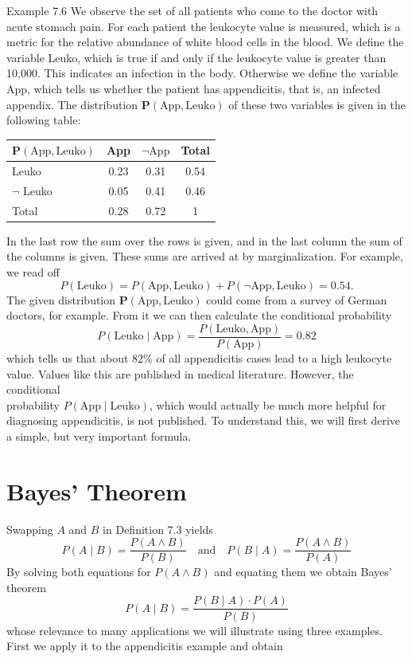 \documentclass[10pt]{book}
\begin{document}
Example 7.6 We observe the set of all patients who come to the doctor with acute stomach pain. For each patient the leukocyte value is measured, which is a metric for the relative abundance of white blood cells in the blood. We define the variable Leuko, which is true if and only if the leukocyte value is greater than 10,000. This indicates an infection in the body. Otherwise we define the variable App, which tells us whether the patient has appendicitis, that is, an infected appendix. The distribution $\boldsymbol{P}(\text{App}, \text{Leuko})$ of these two variables is given in the following table:

\begin{center}
\begin{tabular}{lccc}
\hline
$\boldsymbol{P}(\text{App}, \text{Leuko})$ & App & $\neg\text{App}$ & Total \\
\hline
Leuko & 0.23 & 0.31 & 0.54 \\
\hline
$\neg$ Leuko & 0.05 & 0.41 & 0.46 \\
\hline
Total & 0.28 & 0.72 & 1 \\
\hline
\end{tabular}
\end{center}

In the last row the sum over the rows is given, and in the last column the sum of the columns is given. These sums are arrived at by marginalization. For example, we read off
\[
P(\text{Leuko})=P(\text{App}, \text{Leuko})+P(\neg \text{App}, \text{Leuko})=0.54.
\]
The given distribution $\boldsymbol{P}(\text{App}, \text{Leuko})$ could come from a survey of German doctors, for example. From it we can then calculate the conditional probability
\[
P(\text{Leuko} \mid \text{App})=\frac{P(\text{Leuko}, \text{App})}{P(\text{App})}=0.82
\]
which tells us that about $82\%$ of all appendicitis cases lead to a high leukocyte value. Values like this are published in medical literature. However, the conditional\\
probability $P(\text{App} \mid \text{Leuko})$, which would actually be much more helpful for diagnosing appendicitis, is not published. To understand this, we will first derive a simple, but very important formula.

\section{Bayes' Theorem}
Swapping $A$ and $B$ in Definition 7.3 yields
\[
P(A \mid B)=\frac{P(A \wedge B)}{P(B)} \quad \text{and} \quad P(B \mid A)=\frac{P(A \wedge B)}{P(A)}
\]
By solving both equations for $P(A \wedge B)$ and equating them we obtain Bayes’ theorem
\begin{equation*}
P(A \mid B)=\frac{P(B \mid A)\cdot P(A)}{P(B)} \tag{7.2}
\end{equation*}
whose relevance to many applications we will illustrate using three examples. First we apply it to the appendicitis example and obtain
\end{document}
